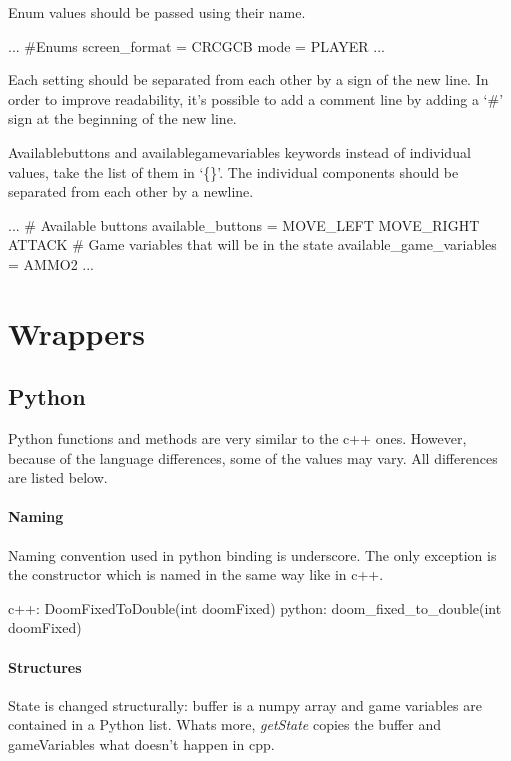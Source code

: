 	Enum values should be passed using their name.


\begin{pblock}
...
#Enums
screen_format = CRCGCB
mode = PLAYER
...
\end{pblock}

	Each setting should be separated from each other by a sign of the new line. In order to improve readability, it's possible to add a comment line by adding a `\#' sign at the beginning of the new line.

Availablebuttons and availablegamevariables keywords instead of individual values, take the list of them in `\{\}'. The individual components should be separated from each other by a newline.
\begin{pblock}
...
# Available buttons
available_buttons = 
	{ 
		MOVE_LEFT 
		MOVE_RIGHT 
		ATTACK 
	}
# Game variables that will be in the state
available_game_variables = { AMMO2}
...
\end{pblock}

\section{Wrappers}
\subsection{Python}

Python functions and methods are very similar to the c++ ones. However, because of the language differences, some of the values may vary. All differences are listed below.

\paragraph {Naming}
Naming convention used in python binding is underscore. The only exception is the constructor which is named in the same way like in c++.

\begin{cblock}
c++: DoomFixedToDouble(int doomFixed)
python: doom_fixed_to_double(int doomFixed)
\end{cblock}


\paragraph {Structures}
 State is changed structurally: buffer is a numpy array and game variables are contained in a Python list. Whats more, \emph{getState} copies the buffer and gameVariables what doesn't happen in cpp. 
